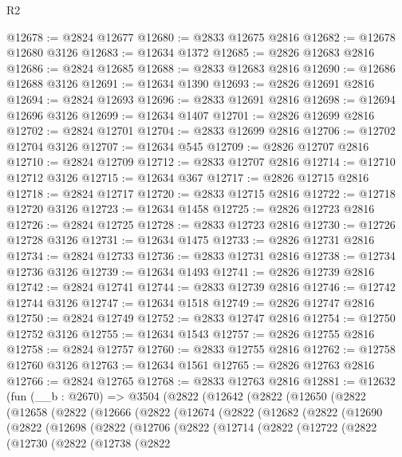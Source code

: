 \begin{lexlean}{R2}
\begin{coremodule}
@12678 := @2824 @12677
@12680 := @2833 @12675 @2816
@12682 := @12678 @12680 @3126
@12683 := @12634 @1372
@12685 := @2826 @12683 @2816
@12686 := @2824 @12685
@12688 := @2833 @12683 @2816
@12690 := @12686 @12688 @3126
@12691 := @12634 @1390
@12693 := @2826 @12691 @2816
@12694 := @2824 @12693
@12696 := @2833 @12691 @2816
@12698 := @12694 @12696 @3126
@12699 := @12634 @1407
@12701 := @2826 @12699 @2816
@12702 := @2824 @12701
@12704 := @2833 @12699 @2816
@12706 := @12702 @12704 @3126
@12707 := @12634 @545
@12709 := @2826 @12707 @2816
@12710 := @2824 @12709
@12712 := @2833 @12707 @2816
@12714 := @12710 @12712 @3126
@12715 := @12634 @367
@12717 := @2826 @12715 @2816
@12718 := @2824 @12717
@12720 := @2833 @12715 @2816
@12722 := @12718 @12720 @3126
@12723 := @12634 @1458
@12725 := @2826 @12723 @2816
@12726 := @2824 @12725
@12728 := @2833 @12723 @2816
@12730 := @12726 @12728 @3126
@12731 := @12634 @1475
@12733 := @2826 @12731 @2816
@12734 := @2824 @12733
@12736 := @2833 @12731 @2816
@12738 := @12734 @12736 @3126
@12739 := @12634 @1493
@12741 := @2826 @12739 @2816
@12742 := @2824 @12741
@12744 := @2833 @12739 @2816
@12746 := @12742 @12744 @3126
@12747 := @12634 @1518
@12749 := @2826 @12747 @2816
@12750 := @2824 @12749
@12752 := @2833 @12747 @2816
@12754 := @12750 @12752 @3126
@12755 := @12634 @1543
@12757 := @2826 @12755 @2816
@12758 := @2824 @12757
@12760 := @2833 @12755 @2816
@12762 := @12758 @12760 @3126
@12763 := @12634 @1561
@12765 := @2826 @12763 @2816
@12766 := @2824 @12765
@12768 := @2833 @12763 @2816
@12881 := @12632
    (fun (__b : @2670) =>
    @3504
      (@2822
        (@12642
          (@2822
            (@12650
              (@2822
                (@12658
                  (@2822
                    (@12666
                      (@2822
                        (@12674
                          (@2822
                            (@12682
                              (@2822
                                (@12690
                                  (@2822
                                    (@12698
                                      (@2822
                                        (@12706
                                          (@2822
                                            (@12714
                                              (@2822
                                                (@12722
                                                  (@2822
                                                    (@12730
                                                      (@2822
                                                        (@12738
                                                          (@2822

\end{coremodule}
\end{lexlean}
